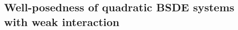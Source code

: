 \documentclass[10pt,a4paper]{article}
\newcommand{\hC}{\hat{C}}
\theoremstyle{plain}
\newtheorem{Theorem}{Theorem}[section]
\newtheorem{Corollary}[Theorem]{Corollary}
\newtheorem{Remark}[Theorem]{Remark}
\theoremstyle{definition}
\numberwithin{equation}{section}
\begin{document}


\subsection{Well-posedness of quadratic BSDE systems with weak interaction}
\label{sec3.1}
\end{document}
